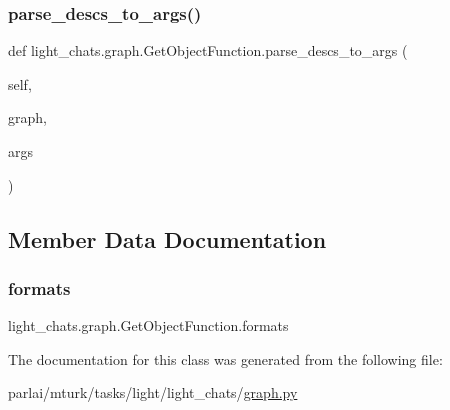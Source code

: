 \subsubsection{\texorpdfstring{parse\+\_\+descs\+\_\+to\+\_\+args()}{parse\_descs\_to\_args()}}
{\footnotesize\ttfamily def light\+\_\+chats.\+graph.\+Get\+Object\+Function.\+parse\+\_\+descs\+\_\+to\+\_\+args (\begin{DoxyParamCaption}\item[{}]{self,  }\item[{}]{graph,  }\item[{}]{args }\end{DoxyParamCaption})}



\subsection{Member Data Documentation}
\mbox{\label{classlight__chats_1_1graph_1_1GetObjectFunction_a726f8b3315bfedc530da445bb3e135e6}} 
\subsubsection{\texorpdfstring{formats}{formats}}
{\footnotesize\ttfamily light\+\_\+chats.\+graph.\+Get\+Object\+Function.\+formats}



The documentation for this class was generated from the following file\+:\begin{DoxyCompactItemize}
\item 
parlai/mturk/tasks/light/light\+\_\+chats/\hyperlink{parlai_2mturk_2tasks_2light_2light__chats_2graph_8py}{graph.\+py}\end{DoxyCompactItemize}
